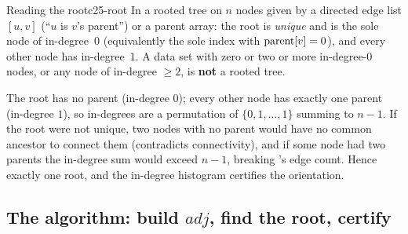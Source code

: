 \begin{proposition}{Reading the root}{c25-root}
In a rooted tree on $n$ nodes given by a directed edge list $[u,v]$ (``$u$ is $v$'s parent'') or a
parent array: the root is \emph{unique} and is the sole node of in-degree~$0$ (equivalently the sole
index with $\operatorname{parent}[v]=0$), and every other node has in-degree~$1$. A data set with zero or two or
more in-degree-$0$ nodes, or any node of in-degree $\ge2$, is \textbf{not} a rooted tree.
\end{proposition}
\begin{proofbox}
The root has no parent (in-degree $0$); every other node has exactly one parent (in-degree $1$), so
in-degrees are a permutation of $\{0,1,\dots,1\}$ summing to $n-1$. If the root were not unique, two
nodes with no parent would have no common ancestor to connect them (contradicts connectivity), and if
some node had two parents the in-degree sum would exceed $n-1$, breaking 's edge
count. Hence exactly one root, and the in-degree histogram certifies the orientation.
\end{proofbox}

\subsection{The algorithm: build \texorpdfstring{$\mathit{adj}$}{adj}, find the root, certify}

